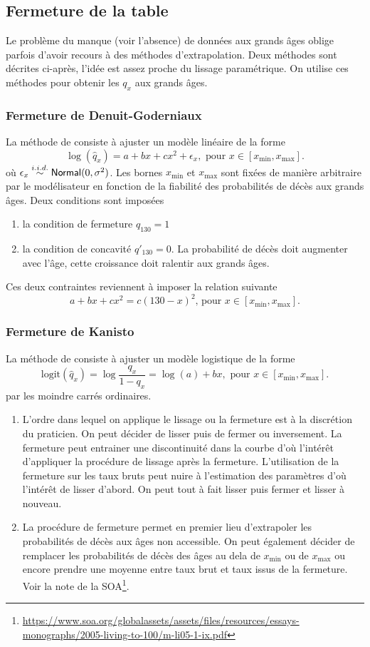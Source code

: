 \subsection{Fermeture de la table}
Le problème du manque (voir l'absence) de données aux grands âges oblige parfois d'avoir recours à des méthodes d'extrapolation. Deux méthodes sont décrites ci-après, l'idée est assez proche du lissage paramétrique. On utilise ces méthodes pour obtenir les $q_x$ aux grands âges. 

\subsubsection{Fermeture de Denuit-Goderniaux}
La méthode de \citet{Denuit2005} consiste à ajuster un modèle linéaire de la forme
$$
\log(\widehat{q}_x) = a + bx + cx^2+\epsilon_x,\text{ pour }x\in [x_{\min}, x_{\max}].
$$
où $\epsilon_x\overset{i.i.d.}{\sim}\mathsf{Normal}(0,\sigma^2)$. Les bornes $x_{\min}$ et $x_{\max}$ sont fixées de manière arbitraire par le modélisateur en fonction de la fiabilité des probabilités de décès aux grands âges. Deux conditions sont imposées
\begin{enumerate}
  \item la condition de fermeture $q_{130} = 1$
  \item la condition de concavité $q'_{130} = 0$. La probabilité de décès doit augmenter avec l'âge, cette croissance doit ralentir aux grands âges.
\end{enumerate}
Ces deux contraintes reviennent à imposer la relation suivante 
$$
a+bx+cx^2 = c(130-x)^2\text{, pour }x\in[x_{\min}, x_{\max}].
$$

\subsubsection{Fermeture de Kanisto}
La méthode de \citet{Thatcher1998} consiste à ajuster un modèle logistique de la forme
$$
\text{logit}(\widehat{q}_x) = \log\frac{q_x}{1-q_x}=\log(a) + bx,\text{ pour }x\in[x_{\min}, x_{\max}].
$$
par les moindre carrés ordinaires.
\begin{remark}
\begin{enumerate}
  \item L'ordre dans lequel on applique le lissage ou la fermeture est à la discrétion du praticien. On peut décider de lisser puis de fermer ou inversement. La fermeture peut entrainer une discontinuité dans la courbe d'où l'intérêt d'appliquer la procédure de lissage après la fermeture. L'utilisation de la fermeture sur les taux bruts peut nuire à l'estimation des paramètres d'où l'intérêt de lisser d'abord. On peut tout à fait lisser puis fermer et lisser à nouveau.
  \item La procédure de fermeture permet en premier lieu d'extrapoler les probabilités de décès aux âges non accessible. On peut également décider de remplacer les probabilités de décès des âges au dela de  $x_{\min}$ ou de  $x_{\max}$ ou encore prendre une moyenne entre taux brut et taux issus de la fermeture. Voir la note de la SOA\footnote{\url{https://www.soa.org/globalassets/assets/files/resources/essays-monographs/2005-living-to-100/m-li05-1-ix.pdf}}.
\end{enumerate}
\end{remark}
